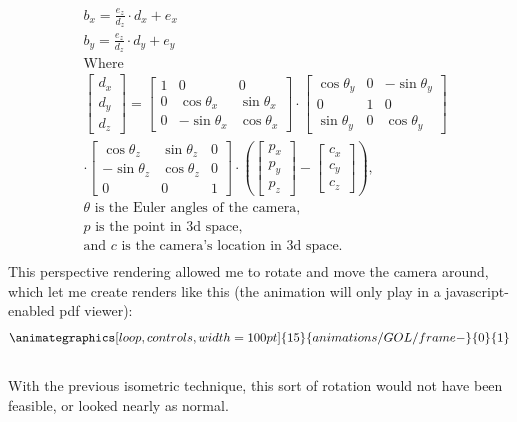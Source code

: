 \documentclass[12pt]{article}
\begin{document}
	\begin{align*}
		&b_x=\frac{e_z}{d_z}\cdot d_x+e_x\\
		&b_y=\frac{e_z}{d_z}\cdot d_y+e_y\\
		&\text{Where}\\
		&\begin{bmatrix}d_x\\d_y\\d_z\end{bmatrix}=\begin{bmatrix}1&0&0\\0&\cos\theta_x&\sin\theta_x\\0&-\sin\theta_x&\cos\theta_x\end{bmatrix}
		\cdot
		\begin{bmatrix}\cos\theta_y&0&-\sin\theta_y\\0&1&0\\\sin\theta_y&0&\cos\theta_y\end{bmatrix}
		\\&\cdot
		\begin{bmatrix}\cos\theta_z&\sin\theta_z&0\\-\sin\theta_z&\cos\theta_z&0\\0&0&1\end{bmatrix}
		\cdot\left(\begin{bmatrix}p_x\\p_y\\p_z\end{bmatrix}-\begin{bmatrix}c_x\\c_y\\c_z\end{bmatrix}\right),\\
		&\theta\text{ is the Euler angles of the camera,}\\
		&p\text{ is the point in 3d space,}\\
		&\text{and }c\text{ is the camera's location in 3d space.}
		\\
	\end{align*}
	This perspective rendering allowed me to rotate and move the camera around, which let me create renders like this (the animation will only play in a javascript-enabled pdf viewer):\\
	\begin{align*}\animategraphics[loop,controls,width=100pt]{15}{animations/GOL/frame-}{0}{1}\end{align*}\\
	With the previous isometric technique, this sort of rotation would not have been feasible, or looked nearly as normal.
\end{document}
